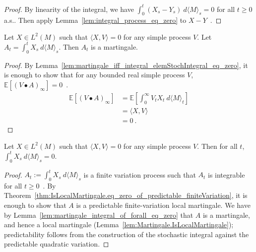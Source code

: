 \begin{proof}
By linearity of the integral, we have $\int_0^t (X_s - Y_s) \: d\langle M \rangle_s = 0$ for all $t \ge 0$ a.s..
Then apply Lemma~\ref{lem:integral_process_eq_zero} to $X - Y$~.
\end{proof}


\begin{lemma}\label{lem:martingale_integral_of_forall_eq_zero}
Let $X \in L^2(M)$ such that $\langle X, V\rangle = 0$ for any simple process $V$. Let $A_t = \int_0^t X_s \: d\langle M \rangle_s$. Then $A_t$ is a martingale.
\end{lemma}

\begin{proof}
By Lemma~\ref{lem:martingale_iff_integral_elemStochIntegral_eq_zero}, it is enough to show that for any bounded real simple process $V$, $\mathbb{E}[(V \bullet A)_\infty] = 0$~.
\begin{align*}
  \mathbb{E}\left[(V \bullet A)_\infty\right]
  &= \mathbb{E}\left[ \int_0^{\infty} V_t X_t \: d\langle M \rangle_t \right]
  \\
  &= \langle X, V \rangle
  \\
  &= 0
  \: .
\end{align*}
\end{proof}


\begin{lemma}\label{lem:integral_eq_zero_of_forall_eq_zero}
Let $X \in L^2(M)$ such that $\langle X, V\rangle = 0$ for any simple process $V$. Then for all $t$, $\int_0^t X_s \: d\langle M \rangle_s = 0$.
\end{lemma}

\begin{proof}
$A_t := \int_0^t X_s \: d\langle M \rangle_s$ is a finite variation process such that $A_t$ is integrable for all $t \ge 0$~.
By Theorem~\ref{thm:IsLocalMartingale.eq_zero_of_predictable_finiteVariation}, it is enough to show that $A$ is a predictable finite-variation local martingale. We have by Lemma~\ref{lem:martingale_integral_of_forall_eq_zero} that $A$ is a martingale, and hence a local martingale (Lemma~\ref{lem:Martingale.IsLocalMartingale}); predictability follows from the construction of the stochastic integral against the predictable quadratic variation.
\end{proof}



